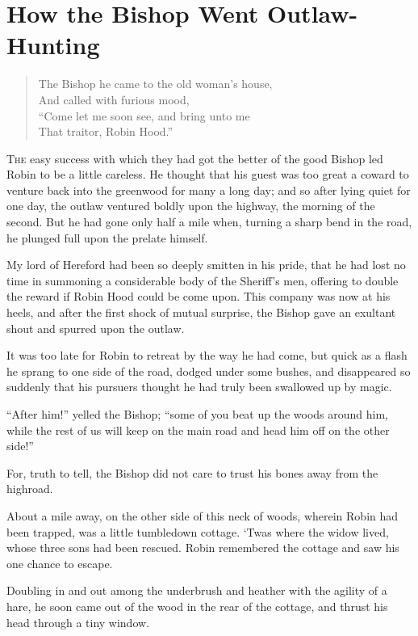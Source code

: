 \chapter{How the Bishop Went Outlaw-Hunting}

\begin{quote}
The Bishop he came to the old woman’s house,\\
And called with furious mood,\\
“Come let me soon see, and bring unto me\\
That traitor, Robin Hood.”
\end{quote}

\lettrine{T}{he} easy success with which they had got the better of the
good Bishop led Robin to be a little careless. He thought that his guest
was too great a coward to venture back into the greenwood for many a
long day; and so after lying quiet for one day, the outlaw ventured
boldly upon the highway, the morning of the second. But he had gone only
half a mile when, turning a sharp bend in the road, he plunged full upon
the prelate himself.

My lord of Hereford had been so deeply smitten in his pride, that he had
lost no time in summoning a considerable body of the Sheriff's men,
offering to double the reward if Robin Hood could be come upon. This
company was now at his heels, and after the first shock of mutual
surprise, the Bishop gave an exultant shout and spurred upon the outlaw.

It was too late for Robin to retreat by the way he had come, but quick
as a flash he sprang to one side of the road, dodged under some bushes,
and disappeared so suddenly that his pursuers thought he had truly been
swallowed up by magic.

``After him!'' yelled the Bishop; ``some of you beat up the woods around
him, while the rest of us will keep on the main road and head him off on
the other side!''

For, truth to tell, the Bishop did not care to trust his bones away from
the highroad.

About a mile away, on the other side of this neck of woods, wherein
Robin had been trapped, was a little tumbledown cottage. `Twas where the
widow lived, whose three sons had been rescued. Robin remembered the
cottage and saw his one chance to escape.

Doubling in and out among the underbrush and heather with the agility of
a hare, he soon came out of the wood in the rear of the cottage, and
thrust his head through a tiny window.

